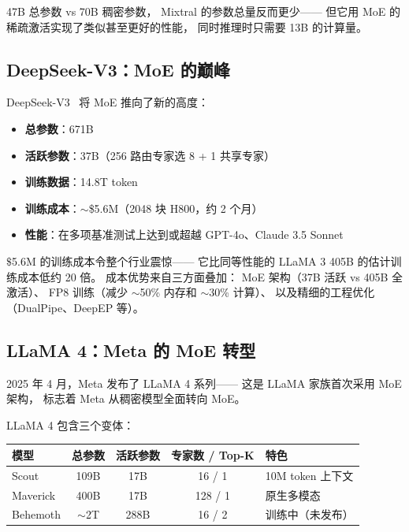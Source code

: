 47B 总参数 vs 70B 稠密参数，
Mixtral 的参数总量反而更少——
但它用 MoE 的稀疏激活实现了类似甚至更好的性能，
同时推理时只需要 13B 的计算量。

\subsection{DeepSeek-V3：MoE 的巅峰}

DeepSeek-V3~\cite{deepseekv3} 将 MoE 推向了新的高度：
\begin{itemize}[noitemsep]
  \item \textbf{总参数}：671B
  \item \textbf{活跃参数}：37B（256 路由专家选 8 + 1 共享专家）
  \item \textbf{训练数据}：14.8T token
  \item \textbf{训练成本}：$\sim$\$5.6M（2048 块 H800，约 2 个月）
  \item \textbf{性能}：在多项基准测试上达到或超越 GPT-4o、Claude 3.5 Sonnet
\end{itemize}

$\$$5.6M 的训练成本令整个行业震惊——
它比同等性能的 LLaMA 3 405B 的估计训练成本低约 20 倍。
成本优势来自三方面叠加：
MoE 架构（37B 活跃 vs 405B 全激活）、
FP8 训练（减少 $\sim$50\% 内存和 $\sim$30\% 计算）、
以及精细的工程优化（DualPipe、DeepEP 等）。

\subsection{LLaMA 4：Meta 的 MoE 转型}
\label{sec:llama4-moe}

2025 年 4 月，Meta 发布了 LLaMA 4 系列——%
这是 LLaMA 家族首次采用 MoE 架构，
标志着 Meta 从稠密模型全面转向 MoE。

LLaMA 4 包含三个变体：
\begin{center}
\begin{tabular}{lcccl}
  \hline
  \textbf{模型} & \textbf{总参数} & \textbf{活跃参数}
  & \textbf{专家数 / Top-K} & \textbf{特色} \\
  \hline
  Scout & 109B & 17B & 16 / 1 & 10M token 上下文 \\
  Maverick & 400B & 17B & 128 / 1 & 原生多模态 \\
  Behemoth & $\sim$2T & 288B & 16 / 2 & 训练中（未发布） \\
  \hline
\end{tabular}
\end{center}

